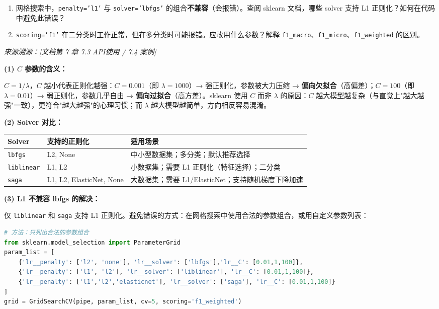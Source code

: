 \documentclass[a4paper,11pt]{ctexart}
\begin{document}
\begin{problembox}
\begin{enumerate}[(1)]
        \item 网格搜索中，\texttt{penalty='l1'} 与 \texttt{solver='lbfgs'} 的组合\textbf{不兼容}（会报错）。查阅 sklearn 文档，哪些 solver 支持 L1 正则化？如何在代码中避免此错误？

        \item \texttt{scoring='f1'} 在二分类时工作正常，但在多分类时可能报错。应改用什么参数？解释 \texttt{f1\_macro}、\texttt{f1\_micro}、\texttt{f1\_weighted} 的区别。
    \end{enumerate}
    {\color{gray}\small\textit{来源溯源：[文档第 7 章 7.3 API使用 / 7.4 案例]}}
\end{problembox}

\begin{solutionbox}[参考答案与详细解析]
    \textbf{(1) $C$ 参数的含义：}

    $C=1/\lambda$，$C$ 越小代表正则化越强：$C=0.001$（即 $\lambda=1000$）→ 强正则化，参数被大力压缩 → \textbf{偏向欠拟合}（高偏差）；$C=100$（即 $\lambda=0.01$）→ 弱正则化，参数几乎自由 → \textbf{偏向过拟合}（高方差）。sklearn 使用 $C$ 而非 $\lambda$ 的原因：$C$ 越大模型越复杂（与直觉上"越大越强"一致），更符合"越大越强"的心理习惯；而 $\lambda$ 越大模型越简单，方向相反容易混淆。

    \textbf{(2) Solver 对比：}
    \begin{center}
    \begin{tabular}{p{2.5cm} p{3.5cm} p{5.5cm}}
        \toprule
        Solver & 支持的正则化 & 适用场景 \\
        \midrule
        \texttt{lbfgs} & L2, None & 中小型数据集；多分类；默认推荐选择 \\[0.8em]
        \texttt{liblinear} & L1, L2 & 小数据集；需要 L1 正则化（特征选择）；二分类 \\[0.8em]
        \texttt{saga} & L1, L2, ElasticNet, None & 大数据集；需要 L1/ElasticNet；支持随机梯度下降加速 \\
        \bottomrule
    \end{tabular}
    \end{center}

    \textbf{(3) L1 不兼容 lbfgs 的解决：}

    仅 \texttt{liblinear} 和 \texttt{saga} 支持 L1 正则化。避免错误的方式：在网格搜索中使用合法的参数组合，或用自定义参数列表：

    \begin{lstlisting}[language=Python]
# 方法：只列出合法的参数组合
from sklearn.model_selection import ParameterGrid
param_list = [
    {'lr__penalty': ['l2', 'none'], 'lr__solver': ['lbfgs'],'lr__C': [0.01,1,100]},
    {'lr__penalty': ['l1', 'l2'], 'lr__solver': ['liblinear'], 'lr__C': [0.01,1,100]},
    {'lr__penalty': ['l1','l2','elasticnet'], 'lr__solver': ['saga'], 'lr__C': [0.01,1,100]}
]
grid = GridSearchCV(pipe, param_list, cv=5, scoring='f1_weighted')
    \end{lstlisting}


\end{solutionbox}
\end{document}

